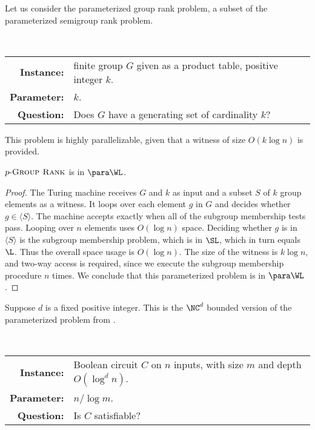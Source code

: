 \documentclass{article}
\newcommand{\dash}{\textnormal{-}}
\newcommand{\pncsat}{p\dash\log\dash\NC^d\dash\textsc{Circuit Sat}}
\newcommand{\pgrouprank}{p\dash\textsc{Group Rank}}
\newcommand{\gen}[1]{\langle#1\rangle}
\begin{document}
Let us consider the parameterized group rank problem, a subset of the parameterized semigroup rank problem.

\begin{definition}[$\pgrouprank$]
  \mbox{} \\
  \begin{tabular}{r p{9.2cm}}
    \textbf{Instance:} & finite group $G$ given as a product table, positive integer $k$. \\
    \textbf{Parameter:} & $k$. \\
    \textbf{Question:} & Does $G$ have a generating set of cardinality $k$?
  \end{tabular}
\end{definition}

This problem is highly parallelizable, given that a witness of size $O(k \log n)$ is provided.

\begin{theorem}\label{thm:pgrouprank}
  $\pgrouprank$ is in $\para \WL$.
\end{theorem}
\begin{proof}
  The Turing machine receives $G$ and $k$ as input and a subset $S$ of $k$ group elements as a witness.
  It loops over each element $g$ in $G$ and decides whether $g \in \gen{S}$.
  The machine accepts exactly when all of the subgroup membership tests pass.
  Looping over $n$ elements uses $O(\log n)$ space.
  Deciding whether $g$ is in $\gen{S}$ is the subgroup membership problem, which is in $\SL$, which in turn equals $\L$.
  Thus the overall space usage is $O(\log n)$.
  The size of the witness is $k \log n$, and two-way access is required, since we execute the subgroup membership procedure $n$ times.
  We conclude that this parameterized problem is in $\para \WL$.
\end{proof}

Suppose $d$ is a fixed positive integer.
This is the $\NC^d$ bounded version of the parameterized problem from \autocite[Lemma~3.26]{fg06}.

\begin{definition}[$\pncsat$]
  \mbox{} \\
  \begin{tabular}{r p{9.2cm}}
    \textbf{Instance:} & Boolean circuit $C$ on $n$ inputs, with size $m$ and depth $O(\log^d n)$. \\
    \textbf{Parameter:} & $n / \log m$. \\
    \textbf{Question:} & Is $C$ satisfiable?
  \end{tabular}
\end{definition}
\end{document}
